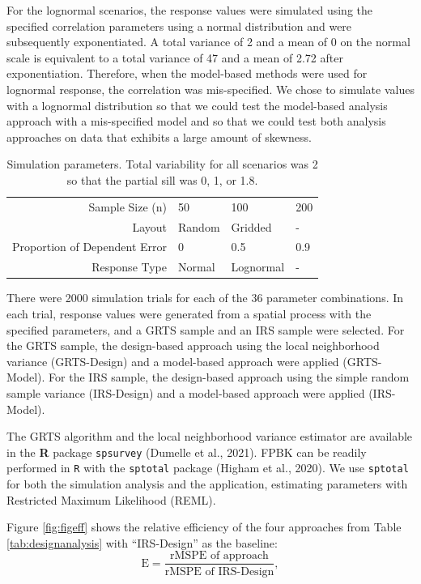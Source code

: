 \documentclass[]{elsarticle} %
\begin{document}
For the lognormal scenarios, the response values were simulated using
the specified correlation parameters using a normal distribution and
were subsequently exponentiated. A total variance of 2 and a mean of 0
on the normal scale is equivalent to a total variance of 47 and a mean
of 2.72 after exponentiation. Therefore, when the model-based methods
were used for lognormal response, the correlation was mis-specified. We
chose to simulate values with a lognormal distribution so that we could
test the model-based analysis approach with a mis-specified model and so
that we could test both analysis approaches on data that exhibits a
large amount of skewness.

\begin{table}[ht]
\centering
\begin{tabular}{r|lll}
   \hline
Sample Size (n) & 50 & 100 & 200 \\ 
  Layout & Random & Gridded & - \\ 
  Proportion of Dependent Error & 0 & 0.5 & 0.9 \\ 
  Response Type & Normal & Lognormal & - \\ 
   \hline
\end{tabular}
\caption{\label{tab:parmtab} Simulation parameters. Total variability for all scenarios was 2 so that the partial sill was 0, 1, or 1.8.} 
\end{table}

There were 2000 simulation trials for each of the 36 parameter
combinations. In each trial, response values were generated from a
spatial process with the specified parameters, and a GRTS sample and an
IRS sample were selected. For the GRTS sample, the design-based approach
using the local neighborhood variance (GRTS-Design) and a model-based
approach were applied (GRTS-Model). For the IRS sample, the design-based
approach using the simple random sample variance (IRS-Design) and a
model-based approach were applied (IRS-Model).

The GRTS algorithm and the local neighborhood variance estimator are
available in the \textbf{\textsf{R}} package \texttt{spsurvey} (Dumelle
et al., 2021). FPBK can be readily performed in \texttt{R} with the
\texttt{sptotal} package (Higham et al., 2020). We use \texttt{sptotal}
for both the simulation analysis and the application, estimating
parameters with Restricted Maximum Likelihood (REML).

Figure \ref{fig:figeff} shows the relative efficiency of the four
approaches from Table \ref{tab:designanalysis} with ``IRS-Design'' as
the baseline: \mbox{} \begin{equation*}
\text{E} = \frac{\text{rMSPE of approach}}{\text{rMSPE of IRS-Design}},
\end{equation*}
\end{document}
